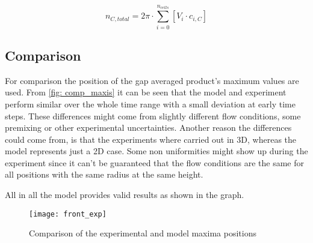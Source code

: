 \documentclass[../thesis.tex]{subfiles}
\begin{document}
\begin{equation}
	n_{C, total} = 2 \pi \cdot \sum_{i=0}^{n_{cells}} \left[ V_i \cdot c_{i, C} \right]
	\label{eqn: tot_prod} 
\end{equation}

\subsection{Comparison}

For comparison the position of the gap averaged product's maximum values are used. From \autoref{fig: comp_maxis} it can be seen that the model and experiment perform similar over the whole time range with a small deviation at early time steps. These differences might come from slightly different flow conditions, some premixing or other experimental uncertainties. Another reason the differences could come from, is that the experiments where carried out in 3D, whereas the model represents just a 2D case. Some non uniformities might show up during the experiment since it can't be guaranteed that the flow conditions are the same for all positions with the same radius at the same height.

All in all the model provides valid results as shown in the graph.
\begin{figure}[htbp]
	\centering
	\texttt{[image: front\_exp]}
	\caption{Comparison of the experimental and model maxima positions}
	\label{fig: comp_maxis}
\end{figure}
\end{document}
